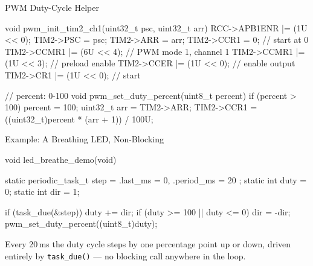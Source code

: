 \documentclass[9pt,aspectratio=169,xcolor=table]{beamer}
\begin{document}
\begin{frame}[fragile]{PWM Duty-Cycle Helper}
\begin{cc}[basicstyle=\ttfamily\small]
		void pwm_init_tim2_ch1(uint32_t psc, uint32_t arr)
		{
			RCC->APB1ENR |= (1U << 0);
			TIM2->PSC = psc;
			TIM2->ARR = arr;
			TIM2->CCR1 = 0;                // start at 0%
			TIM2->CCMR1 |= (6U << 4);      // PWM mode 1, channel 1
			TIM2->CCMR1 |= (1U << 3);      // preload enable
			TIM2->CCER  |= (1U << 0);      // enable output
			TIM2->CR1   |= (1U << 0);      // start
		}

		// percent: 0-100
		void pwm_set_duty_percent(uint8_t percent)
		{
			if (percent > 100) percent = 100;
			uint32_t arr = TIM2->ARR;
			TIM2->CCR1 = ((uint32_t)percent * (arr + 1)) / 100U;
		}
\end{cc}
\end{frame}

\begin{frame}[fragile]{Example: A Breathing LED, Non-Blocking}
\begin{cc}[basicstyle=\ttfamily\small]
		void led_breathe_demo(void)
		{
			static periodic_task_t step = { .last_ms = 0, .period_ms = 20 };
			static int duty = 0;
			static int dir  = 1;

			if (task_due(&step)) {
				duty += dir;
				if (duty >= 100 || duty <= 0) dir = -dir;
				pwm_set_duty_percent((uint8_t)duty);
			}
		}
\end{cc}
	{\small Every 20\,ms the duty cycle steps by one percentage point up or
		down, driven entirely by \texttt{task\_due()} --- no blocking call
		anywhere in the loop.}
\end{frame}
\end{document}
